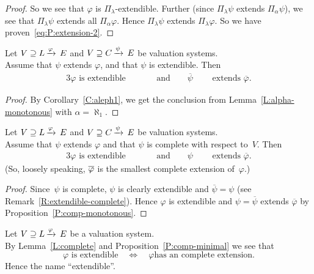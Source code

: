 \begin{proof}
So we see that $\varphi$ is $\Pi_\lambda$-extendible.
Further
(since $\Pi_\lambda\psi$ extends $\Pi_\alpha \psi$),
we see that $\Pi_\lambda \psi$ extends all $\Pi_\alpha\varphi$.
Hence $\Pi_\lambda \psi$ extends $\Pi_\lambda \varphi$.
So we have proven~\eqref{eq:P:extension-2}.
\end{proof}
%
%
\begin{prop}
\label{P:comp-monotonous}
Let $V \supseteq L\,\smash{\xrightarrow{\varphi}\,E}$
and $V \supseteq C\,\smash{\xrightarrow{\psi}\,E}$
 be valuation systems.\\
Assume that
$\psi$ extends $\varphi$,
and that 
$\psi$ is extendible.
Then 
\begin{alignat*}{3}
\text{$\varphi$ is extendible}
\qquad&&\text{and}\qquad
\text{$\overline\psi$ }&&\text{extends $\overline\varphi$}.
\end{alignat*}
\end{prop}
\begin{proof}
By Corollary~\ref{C:aleph1},
we get the conclusion from
Lemma~\ref{L:alpha-monotonous}
with $\alpha=\aleph_1$.
\end{proof}
%
%
\begin{prop}
\label{P:comp-minimal}
Let $V \supseteq L\,\smash{\xrightarrow{\varphi}\,E}$
and $V \supseteq C\,\smash{\xrightarrow{\psi}\,E}$
 be valuation systems.\\
Assume  that
$\psi$ extends $\varphi$
and that $\psi$ is complete
with respect to~$V$.
Then 
\begin{alignat*}{3}
\text{$\varphi$ is extendible}
\qquad&&\text{and}\qquad
\text{$\psi$ }&&\text{extends $\overline\varphi$}.
\end{alignat*}
(So, loosely speaking,
$\overline\varphi$ is the smallest complete extension of~$\varphi$.)
\end{prop}
\begin{proof}
Since~$\psi$ is complete,
$\psi$ is clearly extendible 
and $\overline\psi = \psi$
(see Remark~\ref{R:extendible-complete}).
Hence $\varphi$ is extendible
and $\psi=\overline\psi$ extends $\overline\varphi$
by Proposition~\ref{P:comp-monotonous}.
\end{proof}
%
%
\begin{rem}
Let $V \supseteq L\,\smash{\xrightarrow{\varphi}\,E}$ be a valuation system.\\
By Lemma~\ref{L:complete} and Proposition~\ref{P:comp-minimal}
we see that
\begin{equation*}
\text{$\varphi$ is extendible}
\quad\iff\quad
\text{$\varphi$
has an complete extension}.
\end{equation*}
Hence the name ``extendible''.
\end{rem}
